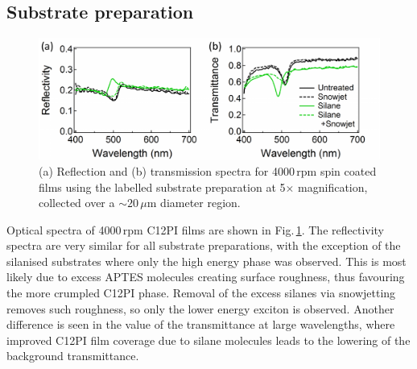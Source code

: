 \subsection{Substrate preparation}
\begin{figure}[ht]
\centering
\includegraphics[width=\textwidth]{Fig3}
\caption{(a) Reflection and (b) transmission spectra for 4000\,rpm spin coated films using the labelled substrate preparation at 5$\times$ magnification, collected over a $\sim20\,\mu$m diameter region.}
\label{4Fig3}
\end{figure}
Optical spectra of 4000\,rpm C12PI films are shown in Fig.\,\ref{4Fig3}. The reflectivity spectra are very similar for all substrate preparations, with the exception of the silanised substrates where only the high energy phase was observed. This is most likely due to excess APTES molecules creating surface roughness, thus favouring the more crumpled C12PI phase. Removal of the excess silanes via snowjetting removes such roughness, so only the lower energy exciton is observed. Another difference is seen in the value of the transmittance at large wavelengths, where improved C12PI film coverage due to silane molecules leads to the lowering of the background transmittance.

